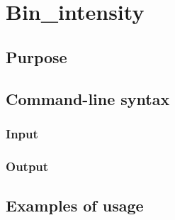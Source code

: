 \section{Bin\_intensity}
\subsection{Purpose}
\subsection{Command-line syntax}
\subsubsection{Input}
\subsubsection{Output}
\subsection{Examples of usage}